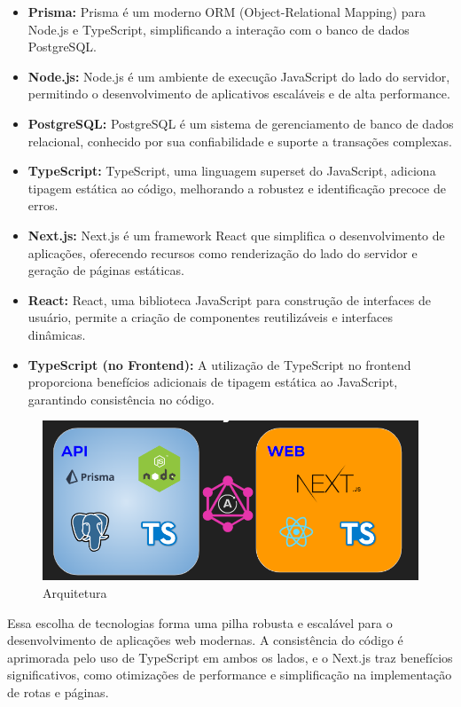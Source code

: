 \documentclass[12pt]{article}
\begin{document}
\begin{itemize}
    \item \textbf{Prisma:} Prisma é um moderno ORM (Object-Relational Mapping) para Node.js e TypeScript, simplificando a interação com o banco de dados PostgreSQL.
    
    \item \textbf{Node.js:} Node.js é um ambiente de execução JavaScript do lado do servidor, permitindo o desenvolvimento de aplicativos escaláveis e de alta performance.
    
    \item \textbf{PostgreSQL:} PostgreSQL é um sistema de gerenciamento de banco de dados relacional, conhecido por sua confiabilidade e suporte a transações complexas.
    
    \item \textbf{TypeScript:} TypeScript, uma linguagem superset do JavaScript, adiciona tipagem estática ao código, melhorando a robustez e identificação precoce de erros.
\end{itemize}

\begin{itemize}
    \item \textbf{Next.js:} Next.js é um framework React que simplifica o desenvolvimento de aplicações, oferecendo recursos como renderização do lado do servidor e geração de páginas estáticas.
    
    \item \textbf{React:} React, uma biblioteca JavaScript para construção de interfaces de usuário, permite a criação de componentes reutilizáveis e interfaces dinâmicas.
    
    \item \textbf{TypeScript (no Frontend):} A utilização de TypeScript no frontend proporciona benefícios adicionais de tipagem estática ao JavaScript, garantindo consistência no código.
\end{itemize}

\begin{figure}[ht]
    \centering
    \includegraphics[width=.3\textwidth]{imgs/Linguagens e Tec do Projeto.png}
    \caption{Arquitetura}
    \label{fig:arquitetura}
\end{figure}

Essa escolha de tecnologias forma uma pilha robusta e escalável para o desenvolvimento de aplicações web modernas. A consistência do código é aprimorada pelo uso de TypeScript em ambos os lados, e o Next.js traz benefícios significativos, como otimizações de performance e simplificação na implementação de rotas e páginas.
\end{document}
